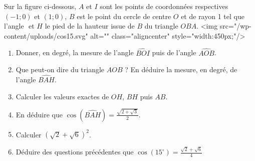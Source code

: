 
%
Sur la figure ci-dessous, $A$ et $I$ sont les points de coordonnées respectives $(-1;0)$ et $(1;0)$, $B$ est le point du cercle de centre $ O $ et de rayon 1 tel que l'angle $  $ et $H$ le pied de la hauteur issue de $B$ du triangle $OBA$.
<img src="/wp-content/uploads/cos15.svg" alt="" class="aligncenter" style="width:450px;"/>

\begin{center}
\end{center}
\begin{enumerate}
     \item
     Donner, en degré, la mesure de l'angle $ \widehat{BOI} $ puis de l'angle $\widehat{AOB}$.
     \item
     Que peut-on dire du triangle $AOB$ ? En déduire la mesure, en degré, de l'angle $\widehat{BAH}$.
     \item
     Calculer les valeurs exactes de $OH$, $BH$ puis $AB$.
     \item
     En déduire que $\cos(\widehat{BAH}) = \frac{\sqrt{2+\sqrt{3}}}{2}$.
     \item
     Calculer $( \sqrt{2} +  \sqrt{6})^2  $.
     \item
     Déduire des questions précédentes que $\cos(15^{\circ})=  \frac{ \sqrt{2} +  \sqrt{6}}{4}  $
\end{enumerate}
